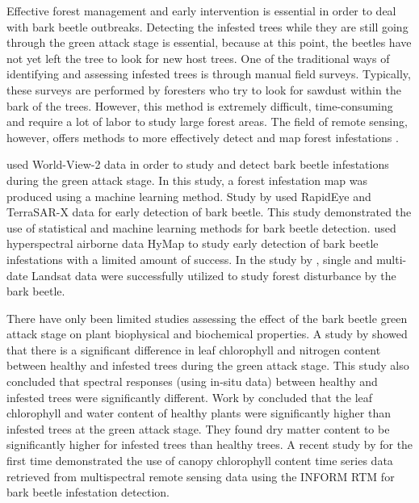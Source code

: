 \documentclass[a4paper, twoside]{templates/ociamthesis}
\begin{document}
Effective forest management and early intervention is essential in order to deal with bark beetle outbreaks. Detecting the infested trees while they are still going through the green attack stage is essential, because at this point, the beetles have not yet left the tree to look for new host trees. One of the traditional ways of identifying and assessing infested trees is through manual field surveys. Typically, these surveys are performed by foresters who try to look for sawdust within the bark of the trees. However, this method is extremely difficult, time-consuming and require a lot of labor to study large forest areas. The field of remote sensing, however, offers methods to more effectively detect and map forest infestations \citep{abdullah2019sentinel, immitzer2014early}.

\citet{immitzer2014early} used World-View-2 data in order to study and detect bark beetle infestations during the green attack stage. In this study, a forest infestation map was produced using a machine learning method. Study by \citet{ortiz2013early} used RapidEye and TerraSAR-X data for early detection of bark beetle. This study demonstrated the use of statistical and machine learning methods for bark beetle detection. \citet{lausch2013forecasting} used hyperspectral airborne data HyMap to study early detection of bark beetle infestations with a limited amount of success. In the study by \citet{lausch2013forecasting}, single and multi-date Landsat data were successfully utilized to study forest disturbance by the bark beetle.

There have only been limited studies assessing the effect of the bark beetle green attack stage on plant biophysical and biochemical properties. A study by \citet{abdullah2018european} showed that there is a significant difference in leaf chlorophyll and nitrogen content between healthy and infested trees during the green attack stage. This study also concluded that spectral responses (using in-situ data) between healthy and infested trees were significantly different. Work by \citet{abdullah2019sentinel} concluded that the leaf chlorophyll and water content of healthy plants were significantly higher than infested trees at the green attack stage. They found dry matter content to be significantly higher for infested trees than healthy trees. A recent study by \citet{ali2021canopy} for the first time demonstrated the use of canopy chlorophyll content time series data retrieved from multispectral remote sensing data using the INFORM RTM for bark beetle infestation detection.
\end{document}
